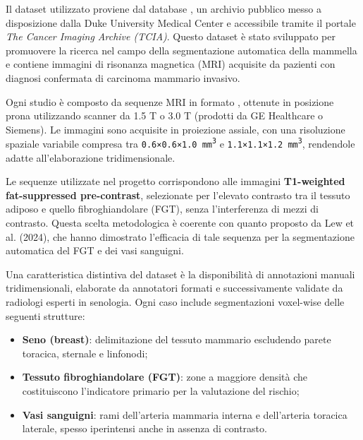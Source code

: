 

Il dataset utilizzato proviene dal database  \cite{duke_breast_mri}, un archivio pubblico messo a disposizione dalla Duke University Medical Center e accessibile tramite il portale \textit{The Cancer Imaging Archive (TCIA)}. Questo dataset è stato sviluppato per promuovere la ricerca nel campo della segmentazione automatica della mammella e contiene immagini di risonanza magnetica (MRI) acquisite da pazienti con diagnosi confermata di carcinoma mammario invasivo.

Ogni studio è composto da sequenze MRI in formato , ottenute in posizione prona utilizzando scanner da 1.5 T o 3.0 T (prodotti da GE Healthcare o Siemens). Le immagini sono acquisite in proiezione assiale, con una risoluzione spaziale variabile compresa tra \texttt{0.6×0.6×1.0 mm\textsuperscript{3}} e \texttt{1.1×1.1×1.2 mm\textsuperscript{3}}, rendendole adatte all'elaborazione tridimensionale.

Le sequenze utilizzate nel progetto corrispondono alle immagini \textbf{T1-weighted fat-suppressed pre-contrast}, selezionate per l’elevato contrasto tra il tessuto adiposo e quello fibroghiandolare (FGT), senza l’interferenza di mezzi di contrasto. Questa scelta metodologica è coerente con quanto proposto da Lew et al. (2024), che hanno dimostrato l’efficacia di tale sequenza per la segmentazione automatica del FGT e dei vasi sanguigni.


Una caratteristica distintiva del dataset è la disponibilità di annotazioni manuali tridimensionali, elaborate da annotatori formati e successivamente validate da radiologi esperti in senologia. Ogni caso include segmentazioni voxel-wise delle seguenti strutture:
\begin{itemize}
\item \textbf{Seno (breast)}: delimitazione del tessuto mammario escludendo parete toracica, sternale e linfonodi;
\item \textbf{Tessuto fibroghiandolare (FGT)}: zone a maggiore densità che costituiscono l’indicatore primario per la valutazione del rischio;
\item \textbf{Vasi sanguigni}: rami dell’arteria mammaria interna e dell’arteria toracica laterale, spesso iperintensi anche in assenza di contrasto.
\end{itemize}


